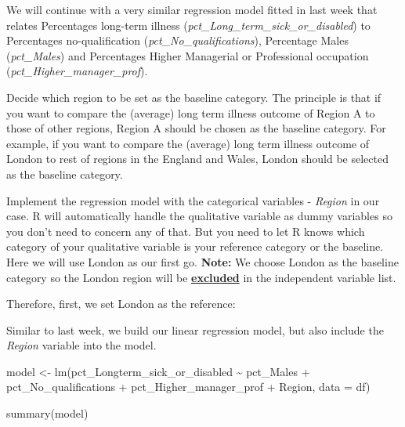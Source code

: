 \documentclass[
  letterpaper,
  DIV=11,
  numbers=noendperiod]{scrreprt}
\newenvironment{Shaded}{\begin{snugshade}}{\end{snugshade}}
\newcommand{\AttributeTok}[1]{\textcolor[rgb]{0.40,0.45,0.13}{#1}}
\newcommand{\FunctionTok}[1]{\textcolor[rgb]{0.28,0.35,0.67}{#1}}
\newcommand{\NormalTok}[1]{\textcolor[rgb]{0.00,0.23,0.31}{#1}}
\newcommand{\OtherTok}[1]{\textcolor[rgb]{0.00,0.23,0.31}{#1}}
\newcommand{\SpecialCharTok}[1]{\textcolor[rgb]{0.37,0.37,0.37}{#1}}
\newcommand{\StringTok}[1]{\textcolor[rgb]{0.13,0.47,0.30}{#1}}
\begin{document}
We will continue with a very similar regression model fitted in last
week that relates Percentages long-term illness
(\emph{pct\_Long\_term\_sick\_or\_disabled}) to Percentages
no-qualification (\emph{pct\_No\_qualifications}), Percentage Males
(\emph{pct\_Males}) and Percentages Higher Managerial or Professional
occupation (\emph{pct\_Higher\_manager\_prof}).

Decide which region to be set as the baseline category. The principle is
that if you want to compare the (average) long term illness outcome of
Region A to those of other regions, Region A should be chosen as the
baseline category. For example, if you want to compare the (average)
long term illness outcome of London to rest of regions in the England
and Wales, London should be selected as the baseline category.

Implement the regression model with the categorical variables -
\emph{Region} in our case. R will automatically handle the qualitative
variable as dummy variables so you don't need to concern any of that.
But you need to let R knows which category of your qualitative variable
is your reference category or the baseline. Here we will use London as
our first go. \textbf{Note:} We choose London as the baseline category
so the London region will be \ul{\textbf{excluded}} in the independent
variable list.

Therefore, first, we set London as the reference:

\begin{Shaded}
\end{Shaded}

Similar to last week, we build our linear regression model, but also
include the \emph{Region} variable into the model.

\begin{Shaded}
\begin{Highlighting}[]
\NormalTok{model }\OtherTok{\textless{}{-}} \FunctionTok{lm}\NormalTok{(pct\_Longterm\_sick\_or\_disabled }\SpecialCharTok{\textasciitilde{}}\NormalTok{ pct\_Males }\SpecialCharTok{+}\NormalTok{ pct\_No\_qualifications }\SpecialCharTok{+}\NormalTok{ pct\_Higher\_manager\_prof }\SpecialCharTok{+}\NormalTok{ Region, }\AttributeTok{data =}\NormalTok{ df)}

\FunctionTok{summary}\NormalTok{(model)}
\end{Highlighting}
\end{Shaded}
\end{document}
